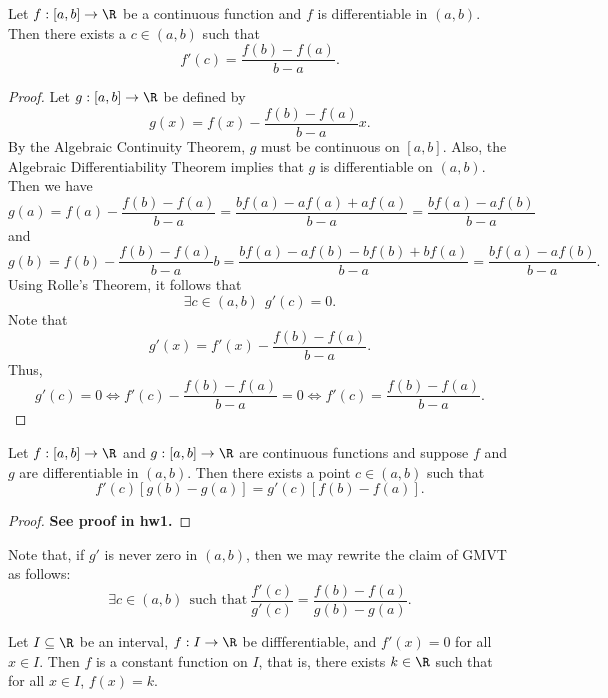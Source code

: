 \begin{theorem}\label{Mean Value Theorem}
    Let \( f: [a,b] \to \R  \) be a continuous function and \( f  \) is differentiable in \( (a,b) \). Then there exists a \( c \in (a,b)  \) such that 
    \[  f'(c) = \frac{ f(b) - f(a) }{  b - a  }. \]
\end{theorem}
\begin{proof}
    Let \( g:[a,b] \to \R  \) be defined by
    \[  g(x) = f(x) - \frac{ f(b) - f(a)  }{  b - a  }  x.  \]
    By the Algebraic Continuity Theorem, \( g  \) must be continuous on \( [a,b] \). Also, the Algebraic Differentiability Theorem implies that \( g  \) is differentiable on \( (a,b) \). Then we have  
    \[  g(a) = f(a) - \frac{ f(b) - f(a) }{  b -a  } = \frac{ b f(a) - a f(a) + a f(a)  }{  b - a  }  = \frac{ bf(a) - a f(b)  }{  b - a  }  \]
    and 
    \[  g(b) = f(b) - \frac{ f(b) - f(a) }{ b - a  } b = \frac{ b f(a) - a f(b) - b f(b) + b f(a) }{  b -a   }  = \frac{ b f(a) - a f(b)  }{  b -a  }. \]
    Using Rolle's Theorem, it follows that 
    \[  \exists c \in (a,b) \ \ g'(c) = 0.  \]
    Note that 
    \[  g'(x) = f'(x) - \frac{ f(b) - f(a) }{ b - a  }. \]
    Thus, 
    \[  g'(c) = 0  \iff f'(c) - \frac{ f(b) - f(a) }{  b -a  }  = 0  \iff f'(c) = \frac{ f(b) -f(a)  }{ b - a  }. \]
\end{proof}  

\begin{theorem}\label{Generalized Mean Value Theorem}
    Let \( f: [a,b] \to \R  \) and \( g : [a,b] \to \R  \) are continuous functions and suppose \( f  \) and \( g  \) are differentiable in \( (a,b) \). Then there exists a point \( c \in (a,b) \) such that 
    \[  f'(c) [g(b) - g(a)] = g'(c) [f(b) - f(a)]. \]
\end{theorem}
\begin{proof}
    \textbf{See proof in hw1.}
\end{proof}

\begin{remark}
    Note that, if \( g'  \) is never zero in \( (a,b) \), then we may rewrite the claim of GMVT as follows:
    \[  \exists c \in (a,b) \ \ \text{such that} \ \frac{ f'(c) }{  g'(c) } =  \frac{ f(b) - f(a) }{  g(b) - g(a) }. \]
\end{remark}

\begin{corollary}[Corollary 1]\label{Corollary 1}
    Let \( I \subseteq  \R   \) be an interval, \( f : I \to \R  \) be diffferentiable, and \( f'(x) = 0  \) for all \( x \in I  \). Then \( f  \) is a constant function on \( I  \), that is, there exists \( k \in \R  \) such that for all \( x \in I  \), \( f(x) = k  \). 
\end{corollary}

